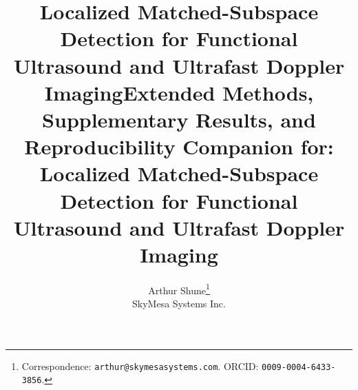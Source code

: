 \documentclass[11pt]{article}
\newif\ifSTAPPAPERONLY
\newif\ifSTAPSUPPLEMENTONLY
\begin{document}
\setlength{\emergencystretch}{1em}

\ifSTAPSUPPLEMENTONLY
\title{Supplementary Material: Localized Matched-Subspace Detection for Functional Ultrasound and Ultrafast Doppler Imaging}
\else\ifSTAPPAPERONLY
\title{Localized Matched-Subspace Detection for Functional Ultrasound and Ultrafast Doppler Imaging}
\else
\title{Extended Methods, Supplementary Results, and Reproducibility Companion for: Localized Matched-Subspace Detection for Functional Ultrasound and Ultrafast Doppler Imaging}
\fi\fi
\author{Arthur Shune\thanks{Correspondence: \texttt{arthur@skymesasystems.com}. ORCID: \texttt{0009-0004-6433-3856}.}\\
\small SkyMesa Systems Inc.}
\date{}
\maketitle
\end{document}

